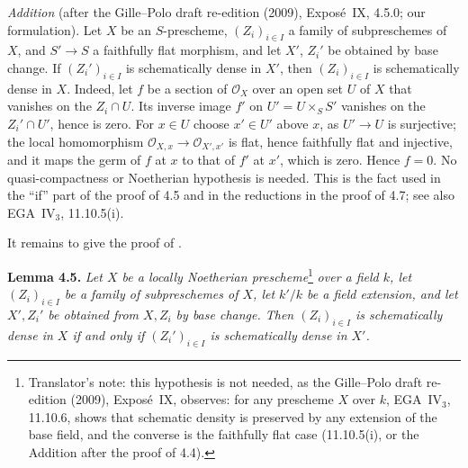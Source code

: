 \medskip
\noindent
\emph{Addition} (after the Gille--Polo draft re-edition (2009),
Expos\'e~IX, 4.5.0; our formulation). Let \(X\) be an \(S\)-prescheme,
\((Z_i)_{i\in I}\) a family of subpreschemes of \(X\), and \(S'\to S\) a
faithfully flat morphism, and let \(X'\), \(Z_i'\) be obtained by base
change. If \((Z_i')_{i\in I}\) is schematically dense in \(X'\), then
\((Z_i)_{i\in I}\) is schematically dense in \(X\). Indeed, let \(f\) be a
section of \(\mathscr O_X\) over an open set \(U\) of \(X\) that vanishes
on the \(Z_i\cap U\). Its inverse image \(f'\) on \(U'=U\times_SS'\)
vanishes on the \(Z_i'\cap U'\), hence is zero. For \(x\in U\) choose
\(x'\in U'\) above \(x\), as \(U'\to U\) is surjective; the local
homomorphism \(\mathscr O_{X,x}\to\mathscr O_{X',x'}\) is flat, hence
faithfully flat and injective, and it maps the germ of \(f\) at \(x\) to
that of \(f'\) at \(x'\), which is zero. Hence \(f=0\). No
quasi-compactness or Noetherian hypothesis is needed. This is the fact
used in the ``if'' part of the proof of 4.5 and in the reductions in the
proof of 4.7; see also EGA~IV\(_3\), 11.10.5(i).

It remains to give the proof of .

\medskip
\noindent{}\textbf{Lemma 4.5.}
\textit{Let \(X\) be a locally Noetherian prescheme}\footnote{Translator's
note: this hypothesis is not needed, as the Gille--Polo draft re-edition
(2009), Expos\'e~IX, observes: for any prescheme \(X\) over \(k\),
EGA~IV\(_3\), 11.10.6, shows that schematic density is preserved by any
extension of the base field, and the converse is the faithfully flat case
(11.10.5(i), or the Addition after the proof of 4.4).}%
\textit{ over a field \(k\), let \((Z_i)_{i\in I}\) be a family of
subpreschemes of \(X\), let \(k'/k\) be a field extension, and let
\(X',Z_i'\) be obtained from \(X,Z_i\) by base change. Then
\((Z_i)_{i\in I}\) is schematically dense in \(X\) if and only if
\((Z_i')_{i\in I}\) is schematically dense in \(X'\).}

